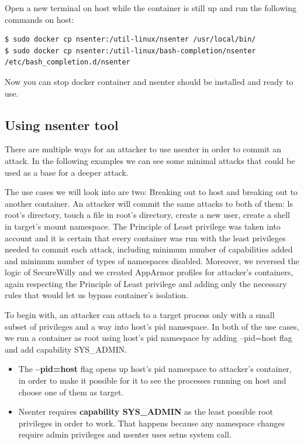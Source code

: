 Open a new terminal on host while the container is still up and run the following commands on host:

\begin{lstlisting}[style=terminal]
$ sudo docker cp nsenter:/util-linux/nsenter /usr/local/bin/
$ sudo docker cp nsenter:/util-linux/bash-completion/nsenter /etc/bash_completion.d/nsenter
\end{lstlisting}

Now you can stop docker container and nsenter should be installed and ready to use.

\subsection{Using nsenter tool}
There are multiple ways for an attacker to use nsenter in order to commit an attack. In the following examples we can see some minimal attacks that could be used as a base for a deeper attack.

The use cases we will look into are two: Breaking out to host and breaking out to another container. An attacker will commit the same attacks to both of them: ls root's directory, touch a file in root's directory, create a new user, create a shell in target's mount namespace.
The Principle of Least privilege was taken into account and it is certain that every container was run with the least privileges needed to commit each attack, including minimum number of capabilities added and minimum number of types of namespaces disabled.
Moreover, we reversed the logic of SecureWilly and we created AppArmor profiles for attacker's containers, again respecting the Principle of Least privilege and adding only the necessary rules that would let us bypass container's isolation. 

To begin with, an attacker can attach to a target process only with a small subset of privileges and a way into host's pid namespace. In both of the use cases, we run a container as root using host's pid namespace by adding --pid=host flag and add capability SYS\_ADMIN.

\begin{itemize}
\item The \textbf{--pid=host} flag opens up host's pid namespace to attacker's container, in order to make it possible for it to see the processes running on host and choose one of them as target.
\item Nsenter requires \textbf{capability SYS\_ADMIN} as the least possible root privileges in order to work. That happens because any namespace changes require admin privileges and nsenter uses setns system call.
\end{itemize}

